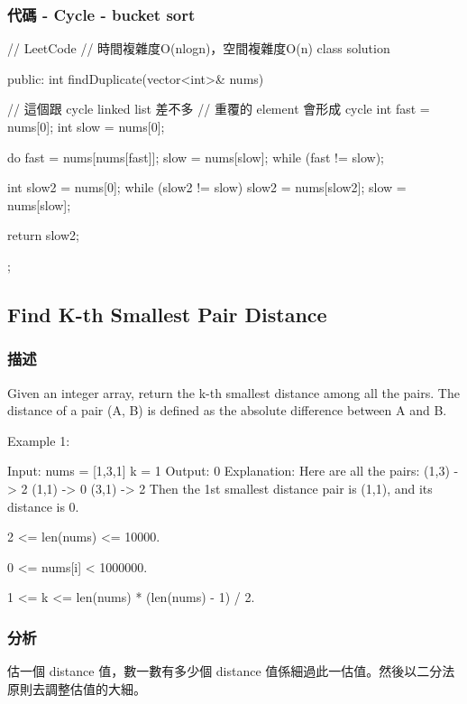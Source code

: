 \subsubsection{代碼 - Cycle - bucket sort}
\begin{Code}
// LeetCode
// 時間複雜度O(nlogn)，空間複雜度O(n)
class solution{
public:
    int findDuplicate(vector<int>& nums) {
        // 這個跟 cycle linked list 差不多
        // 重覆的 element 會形成 cycle
        int fast = nums[0];
        int slow = nums[0];

        do {
            fast = nums[nums[fast]];
            slow = nums[slow];
        } while (fast != slow);

        int slow2 = nums[0];
        while (slow2 != slow) {
            slow2 = nums[slow2];
            slow = nums[slow];
        }

        return slow2;
    }
};
\end{Code}


\subsection{Find K-th Smallest Pair Distance}
\label{sec:kth-smallest-pair-distance}


\subsubsection{描述}
Given an integer array, return the k-th smallest distance among all the pairs. The distance of a pair (A, B) is defined as the absolute difference between A and B.

Example 1:
\begin{Code}
Input:
nums = [1,3,1]
k = 1
Output: 0 
Explanation:
Here are all the pairs:
(1,3) -> 2
(1,1) -> 0
(3,1) -> 2
Then the 1st smallest distance pair is (1,1), and its distance is 0.
\end{Code}


\begindot
\item 2 <= len(nums) <= 10000.
\item 0 <= nums[i] < 1000000.
\item 1 <= k <= len(nums) * (len(nums) - 1) / 2.
\myenddot

\subsubsection{分析}
估一個 distance 值，數一數有多少個 distance 值係細過此一估值。然後以二分法原則去調整估值的大細。

